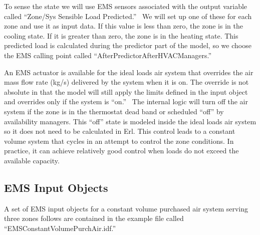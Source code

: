 To sense the state we will use EMS sensors associated with the output variable called ``Zone/Sys Sensible Load Predicted.''~ We will set up one of these for each zone and use it as input data. If this value is less than zero, the zone is in the cooling state. If it is greater than zero, the zone is in the heating state. This predicted load is calculated during the predictor part of the model, so we choose the EMS calling point called ``AfterPredictorAfterHVACManagers.''

An EMS actuator is available for the ideal loads air system that overrides the air mass flow rate (kg/s) delivered by the system when it is on. The override is not absolute in that the model will still apply the limits defined in the input object and overrides only if the system is ``on.''~ The internal logic will turn off the air system if the zone is in the thermostat dead band or scheduled ``off'' by availability managers. This ``off'' state is modeled inside the ideal loads air system so it does not need to be calculated in Erl. This control leads to a constant volume system that cycles in an attempt to control the zone conditions. In practice, it can achieve relatively good control when loads do not exceed the available capacity.

\subsection{EMS Input Objects}\label{ems-input-objects-009}

A set of EMS input objects for a constant volume purchased air system serving three zones follows are contained in the example file called ``EMSConstantVolumePurchAir.idf.''

